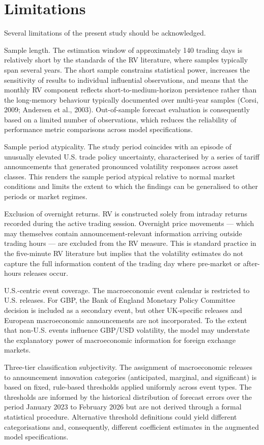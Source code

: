 \documentclass[12pt,a4paper]{report}
\begin{document}
\section{Limitations}
Several limitations of the present study should be acknowledged.

Sample length. The estimation window of approximately 140 trading days is relatively short by the standards of the RV literature, where samples typically span several years. The short sample constrains statistical power, increases the sensitivity of results to individual influential observations, and means that the monthly RV component reflects short-to-medium-horizon persistence rather than the long-memory behaviour typically documented over multi-year samples (Corsi, 2009; Andersen et al., 2003). Out-of-sample forecast evaluation is consequently based on a limited number of observations, which reduces the reliability of performance metric comparisons across model specifications.

Sample period atypicality. The study period coincides with an episode of unusually elevated U.S. trade policy uncertainty, characterised by a series of tariff announcements that generated pronounced volatility responses across asset classes. This renders the sample period atypical relative to normal market conditions and limits the extent to which the findings can be generalised to other periods or market regimes.

Exclusion of overnight returns. RV is constructed solely from intraday returns recorded during the active trading session. Overnight price movements --- which may themselves contain announcement-relevant information arriving outside trading hours --- are excluded from the RV measure. This is standard practice in the five-minute RV literature but implies that the volatility estimates do not capture the full information content of the trading day where pre-market or after-hours releases occur.

U.S.-centric event coverage. The macroeconomic event calendar is restricted to U.S. releases. For GBP, the Bank of England Monetary Policy Committee decision is included as a secondary event, but other UK-specific releases and European macroeconomic announcements are not incorporated. To the extent that non-U.S. events influence GBP/USD volatility, the model may understate the explanatory power of macroeconomic information for foreign exchange markets.

Three-tier classification subjectivity. The assignment of macroeconomic releases to announcement innovation categories (anticipated, marginal, and significant) is based on fixed, rule-based thresholds applied uniformly across event types. The thresholds are informed by the historical distribution of forecast errors over the period January 2023 to February 2026 but are not derived through a formal statistical procedure. Alternative threshold definitions could yield different categorisations and, consequently, different coefficient estimates in the augmented model specifications.
\end{document}
